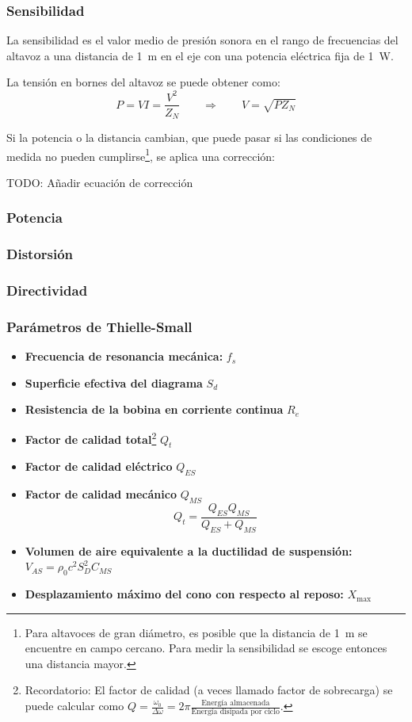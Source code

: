 \documentclass[12pt, a4paper]{article}
\begin{document}
\subsubsection{Sensibilidad}

\color{purple}
La sensibilidad es el valor medio de presión sonora en el rango de frecuencias del altavoz a una distancia de \qty{1}{\meter} en el eje con una potencia eléctrica fija de \qty{1}{\watt}.
\color{black}


La tensión en bornes del altavoz se puede obtener como:
\[ P = V  I = \frac{V^2}{Z_N} \qquad \Longrightarrow \qquad V = \sqrt{P   Z_N} \]

Si la potencia o la distancia cambian, que puede pasar si las condiciones de medida no pueden cumplirse\footnote{Para altavoces de gran diámetro, es posible que la distancia de \qty{1}{\meter} se encuentre en campo cercano. Para medir la sensibilidad se escoge entonces una distancia mayor.}, se aplica una corrección:

TODO: Añadir ecuación de corrección

\subsubsection{Potencia}
\subsubsection{Distorsión}
\subsubsection{Directividad}
\subsubsection{Parámetros de Thielle-Small}

\begin{itemize}
     \item \textbf{Frecuencia de resonancia mecánica:} $f_s$
     \item \textbf{Superficie efectiva del diagrama} $S_d$
     \item \textbf{Resistencia de la bobina en corriente continua} $R_e$
     \item \textbf{Factor de calidad total}\footnote{Recordatorio: El factor de calidad (a veces llamado factor de sobrecarga) se puede calcular como $Q= \frac{\omega_0}{\Delta \omega} = 2\pi \frac{\text{Energía almacenada}}{\text{Energía disipada por ciclo}}$.} $Q_t$
     \item \textbf{Factor de calidad eléctrico} $Q_{ES}$
     \item \textbf{Factor de calidad mecánico} $Q_{MS}$
     \[ Q_t = \frac{Q_{ES}Q_{MS}}{Q_{ES} + Q_{MS}} \]
     \item \textbf{Volumen de aire equivalente a la ductilidad de suspensión:} $V_{AS} = \rho_0c^2S_D^2C_{MS}$
     \item \textbf{Desplazamiento máximo del cono con respecto al reposo:} $X_{\text{max}}$
\end{itemize}
\end{document}
